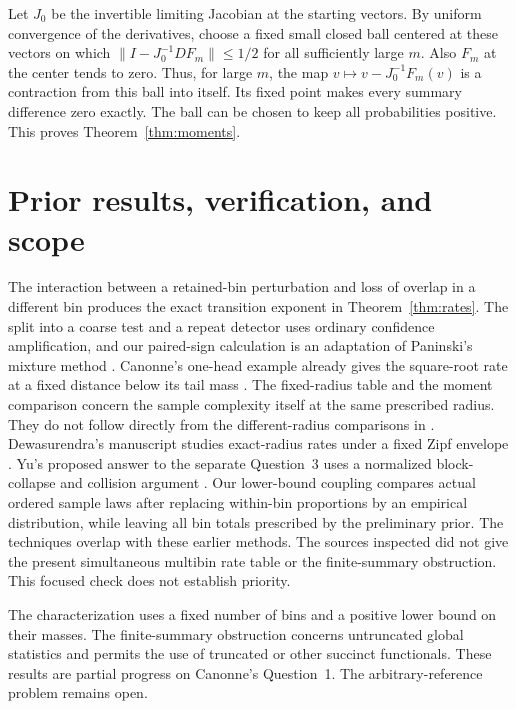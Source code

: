 \documentclass[11pt]{article}
\begin{document}
Let \(J_0\) be the invertible limiting Jacobian at the starting vectors. By uniform convergence of the derivatives, choose a fixed small closed ball centered at these vectors on which \(\|I-J_0^{-1} DF_m\|\le1/2\) for all sufficiently large \(m\). Also \(F_m\) at the center tends to zero. Thus, for large \(m\), the map \(v\mapsto v-J_0^{-1}F_m(v)\) is a contraction from this ball into itself. Its fixed point makes every summary difference zero exactly. The ball can be chosen to keep all probabilities positive. This proves Theorem~\ref{thm:moments}.

\section{Prior results, verification, and scope}

The interaction between a retained-bin perturbation and loss of overlap in a different bin produces the exact transition exponent in Theorem~\ref{thm:rates}. The split into a coarse test and a repeat detector uses ordinary confidence amplification, and our paired-sign calculation is an adaptation of Paninski's mixture method \cite{paninski}. Canonne's one-head example already gives the square-root rate at a fixed distance below its tail mass \cite[Section~4]{canonne}. The fixed-radius table and the moment comparison concern the sample complexity itself at the same prescribed radius. They do not follow directly from the different-radius comparisons in \cite{vv,bcg,cc}. Dewasurendra's manuscript studies exact-radius rates under a fixed Zipf envelope \cite{zipf}. Yu's proposed answer to the separate Question~3 uses a normalized block-collapse and collision argument \cite{yu}. Our lower-bound coupling compares actual ordered sample laws after replacing within-bin proportions by an empirical distribution, while leaving all bin totals prescribed by the preliminary prior. The techniques overlap with these earlier methods. The sources inspected did not give the present simultaneous multibin rate table or the finite-summary obstruction. This focused check does not establish priority.

The characterization uses a fixed number of bins and a positive lower bound on their masses. The finite-summary obstruction concerns untruncated global statistics and permits the use of truncated or other succinct functionals. These results are partial progress on Canonne's Question~1. The arbitrary-reference problem remains open.
\end{document}
